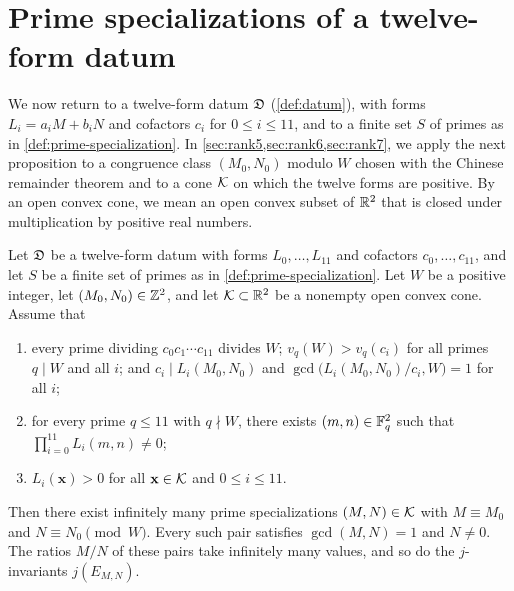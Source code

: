 \section{Prime specializations of a twelve-form datum}\label{sec:primes-infinitude}

We now return to a twelve-form datum $\mathfrak D$ (\cref{def:datum}), with forms $L_i=a_iM+b_iN$ and cofactors $c_i$ for $0\le i\le11$, and to a finite set $S$ of primes as in \cref{def:prime-specialization}. In \cref{sec:rank5,sec:rank6,sec:rank7}, we apply the next proposition to a congruence class $(M_0,N_0)$ modulo $W$ chosen with the Chinese remainder theorem and to a cone $\mathcal K$ on which the twelve forms are positive. By an open convex cone, we mean an open convex subset of $\mathbb R^2$ that is closed under multiplication by positive real numbers.

\begin{proposition}\label{prop:infinitely-many}
Let $\mathfrak D$ be a twelve-form datum with forms $L_0,\dots,L_{11}$ and cofactors $c_0,\dots,c_{11}$, and let $S$ be a finite set of primes as in \cref{def:prime-specialization}. Let $W$ be a positive integer, let $(M_0,N_0)\in\mathbb Z^2$, and let $\mathcal K\subset\mathbb R^2$ be a nonempty open convex cone. Assume that
\begin{enumerate}[label=(\alph*)]
\item\label{item:inf-progression} every prime dividing $c_0c_1\cdots c_{11}$ divides $W$; $v_q(W)>v_q(c_i)$ for all primes $q\mid W$ and all $i$; and $c_i\mid L_i(M_0,N_0)$ and $\gcd\big(L_i(M_0,N_0)/c_i,W\big)=1$ for all $i$;
\item\label{item:inf-small-primes} for every prime $q\le11$ with $q\nmid W$, there exists $(m,n)\in\mathbb F_q^2$ such that $\prod_{i=0}^{11}L_i(m,n)\ne0$;
\item\label{item:inf-cone} $L_i(\mathbf x)>0$ for all $\mathbf x\in\mathcal K$ and $0\le i\le11$.
\end{enumerate}
Then there exist infinitely many prime specializations $(M,N)\in\mathcal K$ with $M\equiv M_0$ and $N\equiv N_0\pmod W$. Every such pair satisfies $\gcd(M,N)=1$ and $N\ne0$. The ratios $M/N$ of these pairs take infinitely many values, and so do the $j$-invariants $j(E_{M,N})$.
\end{proposition}

